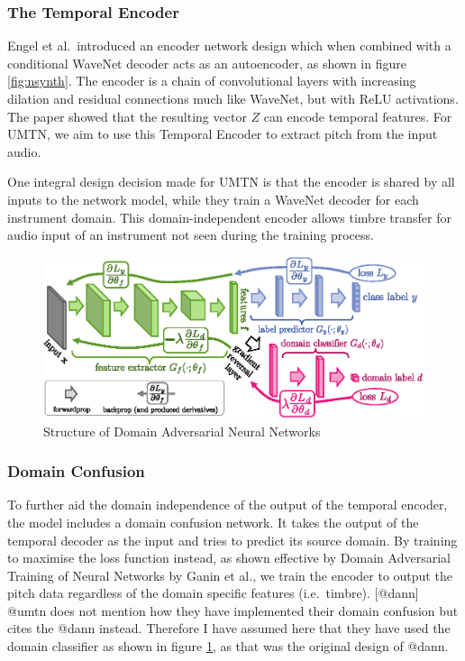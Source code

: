 \documentclass[]{report}
\begin{document}
\hypertarget{the-temporal-encoder}{%
\subsubsection{The Temporal Encoder}\label{the-temporal-encoder}}

Engel et al.~introduced an encoder network design which when combined
with a conditional WaveNet decoder acts as an autoencoder, as shown in
figure \ref{fig:nsynth}. The encoder is a chain of convolutional layers
with increasing dilation and residual connections much like WaveNet, but
with ReLU activations. The paper showed that the resulting vector \(Z\)
can encode temporal features. For UMTN, we aim to use this Temporal
Encoder to extract pitch from the input audio.

One integral design decision made for UMTN is that the encoder is shared
by all inputs to the network model, while they train a WaveNet decoder
for each instrument domain. This domain-independent encoder allows
timbre transfer for audio input of an instrument not seen during the
training process.

\begin{figure}[h]
    \includegraphics[width=\textwidth]{figures/dann.eps}
    \centering
    \caption{Structure of Domain Adversarial Neural Networks \label{fig:dann}}
\end{figure}

\hypertarget{domain-confusion}{%
\subsubsection{Domain Confusion}\label{domain-confusion}}

To further aid the domain independence of the output of the temporal
encoder, the model includes a domain confusion network. It takes the
output of the temporal decoder as the input and tries to predict its
source domain. By training to maximise the loss function instead, as
shown effective by Domain Adversarial Training of Neural Networks by
Ganin et al., we train the encoder to output the pitch data regardless
of the domain specific features (i.e.~timbre). {[}@dann{]} @umtn does
not mention how they have implemented their domain confusion but cites
the @dann instead. Therefore I have assumed here that they have used the
domain classifier as shown in figure \ref{fig:dann}, as that was the
original design of @dann.
\end{document}
